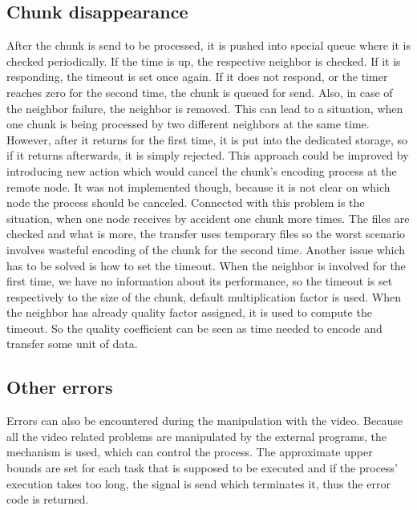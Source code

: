 \subsection*{Chunk disappearance}

After the chunk is send to be processed, it is pushed into special queue
where it is checked periodically. If the time is up, the respective
neighbor is checked. If it is responding, the timeout is set once again.
If it does not respond, or the timer reaches zero for the second time,
the chunk is queued for send. Also, in case of the neighbor failure, the
neighbor is removed. This can lead to a situation, when one chunk is
being processed by two different neighbors at the same time. However,
after it returns for the first time, it is put into the dedicated
storage, so if it returns afterwards, it is simply rejected. This
approach could be improved by introducing new action which would cancel
the chunk's encoding process at the remote node. It was not implemented
though, because it is not clear on which node the process should be
canceled. Connected with this problem is the situation, when one node
receives by accident one chunk more times. The files are checked and
what is more, the transfer uses temporary files so the worst scenario
involves wasteful encoding of the chunk for the second time. Another
issue which has to be solved is how to set the timeout. When the
neighbor is involved for the first time, we have no information about
its performance, so the timeout is set respectively to the size of the
chunk, default multiplication factor is used. When the neighbor has
already quality factor assigned, it is used to compute the timeout. So
the quality coefficient can be seen as time needed to encode and
transfer some unit of data.

\subsection*{Other errors}

Errors can also be encountered during the manipulation with the video.
Because all the video related problems are manipulated by the external
programs, the mechanism is used, which can control the process. The
approximate upper bounds are set for each task that is supposed to be
executed and if the process' execution takes too long, the signal is
send which terminates it, thus the error code is returned.
